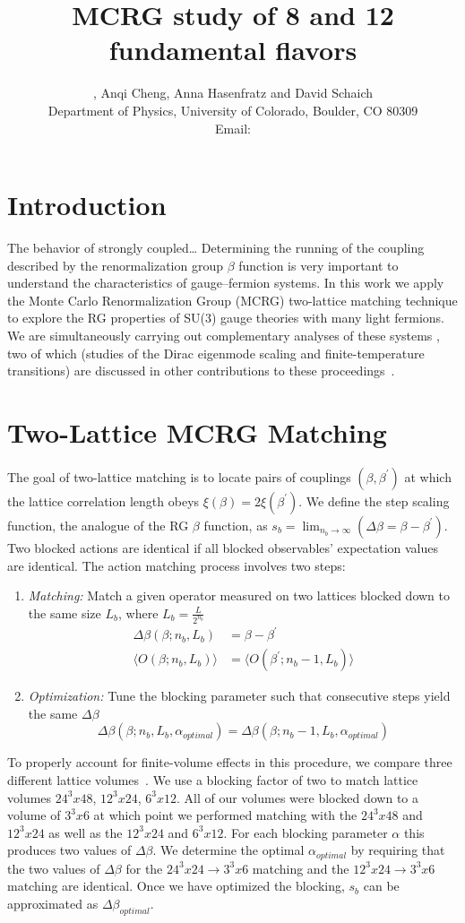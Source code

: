 \documentclass{PoS}
\title{MCRG study of 8 and 12 fundamental flavors}
\author{\speaker{Gregory Petropoulos}, Anqi Cheng, Anna Hasenfratz and David Schaich \\
  Department of Physics, University of Colorado, Boulder, CO 80309 \\
  Email: \email{gregory.petropoulos@colorado.edu}
}
\begin{document}
\section{Introduction}
The behavior of strongly coupled\dots
Determining the running of the coupling described by the renormalization group $\beta$ function is very important to understand the characteristics of gauge--fermion systems.
In this work we apply the Monte Carlo Renormalization Group (MCRG) two-lattice matching technique to explore the RG properties of SU(3) gauge theories with many light fermions.
We are simultaneously carrying out complementary analyses of these systems , two of which (studies of the Dirac eigenmode scaling and finite-temperature transitions) are discussed in other contributions to these proceedings~\cite{Hasenfratz:2012fp, Schaich:2012fr}.

\section{\label{sec:MCRG}Two-Lattice MCRG Matching}
The goal of two-lattice matching is to locate pairs of couplings $(\beta, \beta^{\prime})$ at which the lattice correlation length obeys $\xi(\beta)=2\xi(\beta^{\prime})$.
We define the step scaling function, the analogue of the RG $\beta$ function, as $s_b= \lim_{n_b\to\infty}(\Delta\beta=\beta - \beta^{\prime})$.
Two blocked actions are identical if all blocked observables' expectation values are identical.
The action matching process involves two steps:
\begin{enumerate}
  \item \emph{Matching:} Match a given operator measured on two lattices blocked down to the same size $L_b$, where $L_b=\frac{L}{2^{n_b}}$
  \begin{align}
    \Delta\beta(\beta;n_b,L_b) & = \beta-\beta^{\prime} \\
    \langle O(\beta;n_b,L_b)\rangle & = \langle O(\beta^{\prime};n_b-1,L_b)\rangle
  \end{align}
  \item \emph{Optimization:} Tune the blocking parameter such that consecutive steps yield the same $\Delta\beta$
  \begin{equation}
    \Delta\beta(\beta;n_b,L_b,\alpha_{optimal})=\Delta\beta(\beta;n_b-1,L_b,\alpha_{optimal})
  \end{equation}
\end{enumerate}

To properly account for finite-volume effects in this procedure, we compare three different lattice volumes~\cite{Hasenfratz:2011xn}.
We use a blocking factor of two to match lattice volumes $24^3x48$, $12^3x24$, $6^3x12$.
All of our volumes were blocked down to a volume of $3^3x6$ at which point we performed matching with the $24^3x48$ and $12^3x24$ as well as the $12^3x24$ and $6^3x12$.
For each blocking parameter $\alpha$ this produces two values of $\Delta\beta$.
We determine the optimal $\alpha_{optimal}$ by requiring that the two values of $\Delta\beta$ for the $24^3x24\to3^3x6$ matching and the $12^3x24\to3^3x6$ matching are identical.
Once we have optimized the blocking, $s_b$ can be approximated as $\Delta\beta_{optimal}$.
\end{document}
